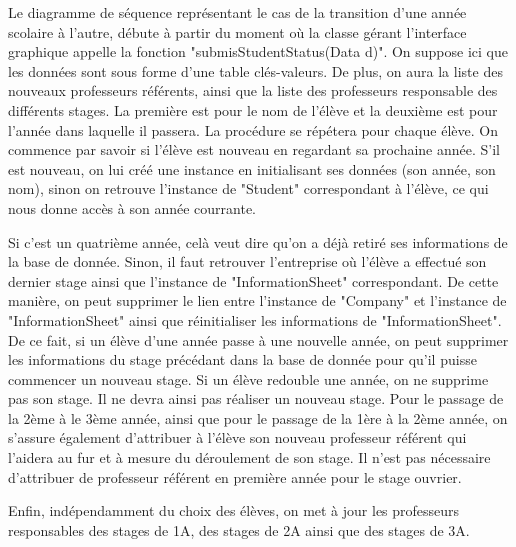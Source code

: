 \documentclass{scrreprt}
\begin{document}
	Le diagramme de séquence représentant le cas de la transition d'une année scolaire à l'autre, débute à partir du moment
où la classe gérant l'interface graphique appelle la fonction "submisStudentStatus(Data d)". On suppose ici que les données
sont sous forme d'une table clés-valeurs. De plus, on aura la liste des nouveaux professeurs référents, ainsi que la liste des professeurs
responsable des différents stages. La première est pour le nom de l'élève et la deuxième est pour l'année dans laquelle
il passera. La procédure se répétera pour chaque élève. On commence par savoir si l'élève est nouveau en regardant sa prochaine année.
S'il est nouveau, on lui créé une instance en initialisant ses données (son année, son nom), sinon on retrouve l'instance de "Student" 
correspondant à l'élève, ce qui nous donne accès à son année courrante. 

	Si c'est un quatrième année, celà veut dire qu'on a déjà retiré ses informations de la base de donnée. Sinon, il faut retrouver 
l'entreprise où l'élève a effectué son dernier stage ainsi que l'instance de "InformationSheet" correspondant. De cette manière, on peut 
supprimer le lien entre l'instance de "Company" et l'instance de "InformationSheet" ainsi que réinitialiser les informations de 
"InformationSheet". De ce fait, si un élève d'une année passe à une nouvelle année, on peut supprimer les informations du stage précédant 
dans la base de donnée pour qu'il puisse commencer un nouveau stage. Si un élève redouble une année, on ne supprime pas son stage. Il ne 
devra ainsi pas réaliser un nouveau stage. Pour le passage de la 2ème à le 3ème année, ainsi que pour le passage de la 1ère à la 2ème année, 
on s'assure également d'attribuer à l'élève son nouveau professeur référent qui l'aidera au fur et à mesure du déroulement de son stage. 
Il n'est pas nécessaire d'attribuer de professeur référent en première année pour le stage ouvrier. 

	Enfin, indépendamment du choix des élèves, on met à jour les professeurs responsables des stages de 1A, des stages de 2A ainsi que 
des stages de 3A.  
\end{document}
